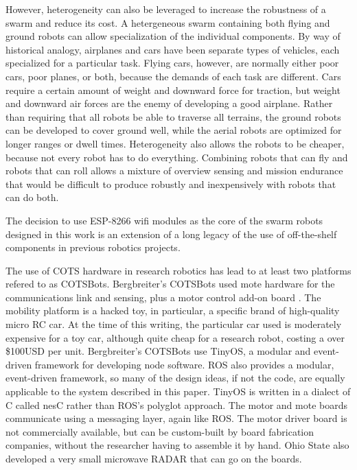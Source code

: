 \documentclass[]{article}
\begin{document}
However, heterogeneity can also be leveraged to increase the robustness of a swarm and reduce its cost. 
A hetergeneous swarm containing both flying and ground robots can allow specialization of the individual components. 
By way of historical analogy, airplanes and cars have been separate types of vehicles, each specialized for a particular task. 
Flying cars, however, are normally either poor cars, poor planes, or both, because the demands of each task are different. 
Cars require a certain amount of weight and downward force for traction, but weight and downward air forces are the enemy of developing a good airplane. 
Rather than requiring that all robots be able to traverse all terrains, the ground robots can be developed to cover ground well, while the aerial robots are optimized for longer ranges or dwell times. 
Heterogeneity also allows the robots to be cheaper, because not every robot has to do everything.
Combining robots that can fly and robots that can roll allows a mixture of overview sensing and mission endurance that would be difficult to produce robustly and inexpensively with robots that can do both. 

The decision to use ESP-8266 wifi modules as the core of the swarm robots designed in this work is an extension of a long legacy of the use of off-the-shelf components in previous robotics projects. 

The use of COTS hardware in research robotics has lead to at least two platforms refered to as COTSBots.
Bergbreiter's COTSBots used mote hardware for the communications link and sensing, plus a motor control add-on board  \cite{bergbreiter2003cotsbots}. 
The mobility platform is a hacked toy, in particular, a specific brand of high-quality micro RC car.
At the time of this writing, the particular car used is moderately expensive for a toy car, although quite cheap for a research robot, costing a over \$100USD per unit. 
Bergbreiter's COTSBots use TinyOS, a modular and event-driven framework for developing node software. 
ROS also provides a modular, event-driven framework, so many of the design ideas, if not the code, are equally applicable to the system described in this paper. 
TinyOS is written in a dialect of C called nesC rather than ROS's polyglot approach. The motor and mote boards communicate using a messaging layer, again like ROS. 
The motor driver board is not commercially available, but can be custom-built by board fabrication companies, without the researcher having to assemble it by hand. 
Ohio State also developed a very small microwave RADAR that can go on the boards.
\end{document}
